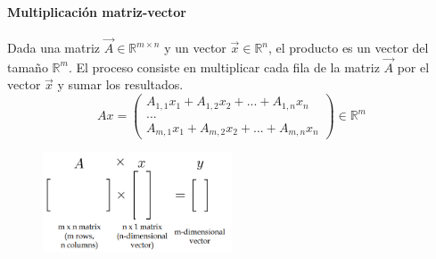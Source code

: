 \paragraph{Multiplicación matriz-vector} Dada una matriz $\vec{A} \in \mathbb{R}^{m \times n}$ y un vector $\vec{x} \in \mathbb{R}^n$, el producto es un vector del tamaño $\mathbb{R}^m$. El proceso consiste en multiplicar cada fila de la matriz $\vec{A}$ por el vector $\vec{x}$ y sumar los resultados.
$$Ax = \begin{pmatrix}
A_{1,1}x_1 + A_{1,2}x_2 + ... + A_{1,n}x_n \\
... \\
A_{m,1}x_1 + A_{m,2}x_2 + ... + A_{m,n}x_n
\end{pmatrix} \in \mathbb{R}^m$$

\begin{figure}[h]
\centering
\includegraphics[width = 0.5\textwidth]{figs/matrix-vector-mult.png}
\end{figure}

